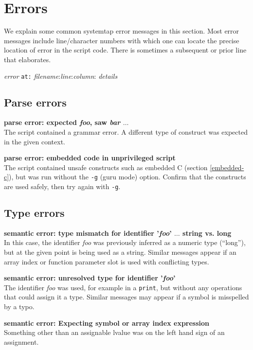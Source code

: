 \documentclass{article}
\begin{document}
\section{Errors}

We explain some common systemtap error messages in this section.  Most
error messages include line/character numbers with which one can
locate the precise location of error in the script code.  There is
sometimes a subsequent or prior line that elaborates.

{\large {\em error} {\tt at:} {\em filename}:{\em line}:{\em column}: {\em details}}

\subsection{Parse errors}

\begin{description}
\item{\bf parse error: expected {\em foo}, saw {\em bar} $\ldots$} \\
The script contained a grammar error.  A different type of construct
was expected in the given context.

\item{\bf parse error: embedded code in unprivileged script} \\ The
script contained unsafe constructs such as embedded C (section
\ref{embedded-c}), but was run without the \verb+-g+ (guru mode)
option.  Confirm that the constructs are used safely, then try
again with \verb+-g+.
\end{description}

\subsection{Type errors}

\begin{description}
\item{\bf semantic error: type mismatch for identifier '{\em foo}'
$\ldots$ string vs. long} \\ In this case, the identifier {\em foo}
was previously inferred as a numeric type (``long''), but at the given
point is being used as a string.  Similar messages appear if an array
index or function parameter slot is used with conflicting types.

\item{\bf semantic error: unresolved type for identifier '{\em foo}'}
\\ The identifier {\em foo} was used, for example in a \verb+print+,
but without any operations that could assign it a type.  Similar
messages may appear if a symbol is misspelled by a typo.

\item{\bf semantic error: Expecting symbol or array index expression}
\\ Something other than an assignable lvalue was on the left hand sign
of an assignment.
\end{description}
\end{document}
